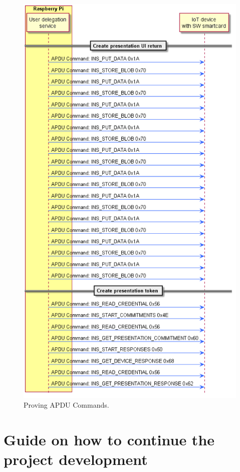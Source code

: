 \begin{figure}[bth]
	\begin{center}
		\includegraphics[width=\linewidth]{gfx/APDUsProving}
	\end{center}
	\caption{Proving APDU Commands.}
	\label{fig:APDUsProving}
\end{figure}

\chapter{Guide on how to continue the project development}
